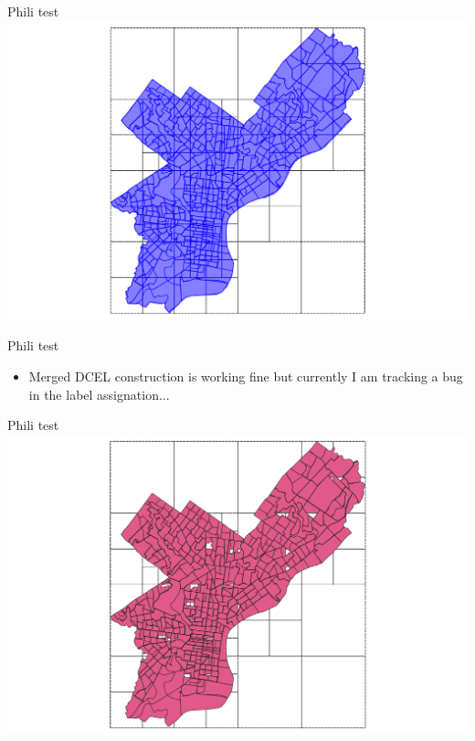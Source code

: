 \documentclass{beamer}
\begin{document}
\begin{frame}{Phili test}
    \centering 
    \includegraphics[width=\linewidth]{figures/phili03} 
\end{frame}

\begin{frame}{Phili test}
    \begin{itemize}
        \item Merged DCEL construction is working fine but currently I am tracking a bug in the label assignation...
    \end{itemize}
\end{frame}

\begin{frame}{Phili test}
    \centering 
    \includegraphics[width=\linewidth]{figures/phili04} 
\end{frame}
\end{document}
